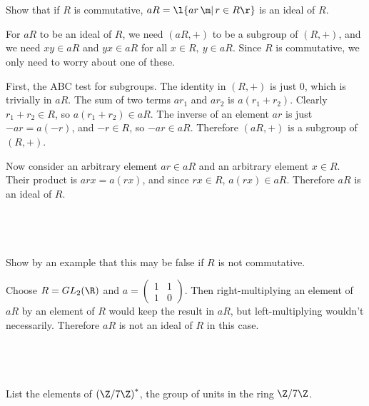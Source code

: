 \documentclass[a4paper]{article}
\begin{document}
\subsection{~} %

\begin{questionbody}
Show that if $R$ is commutative, $aR = \l\{ar \,\m|\, r \in R\r\}$ is an ideal of $R$.
\end{questionbody}

For $aR$ to be an ideal of $R$, we need $(aR, +)$ to be a subgroup of $(R, +)$, and we need $xy \in aR$ and $yx \in aR$ for all $x \in R,\ y \in aR$. Since $R$ is commutative, we only need to worry about one of these.

First, the ABC test for subgroups. The identity in $(R, +)$ is just $0$, which is trivially in $aR$. The sum of two terms $ar_1$ and $ar_2$ is $a(r_1 + r_2)$. Clearly $r_1 + r_2 \in R$, so $a(r_1 + r_2) \in aR$. The inverse of an element $ar$ is just $-ar = a(-r)$, and $-r \in R$, so $-ar \in aR$. Therefore $(aR, +)$ is a subgroup of $(R, +)$.

Now consider an arbitrary element $ar \in aR$ and an arbitrary element $x \in R$. Their product is $arx = a(rx)$, and since $rx \in R$, $a(rx) \in aR$. Therefore $aR$ is an ideal of $R$.

\subsection{~} %

\begin{questionbody}
Show by an example that this may be false if $R$ is not commutative.
\end{questionbody}

Choose $R = GL_2(\R)$ and $a = \begin{pmatrix}1 & 1 \\ 1 & 0\end{pmatrix}$. Then right-multiplying an element of $aR$ by an element of $R$ would keep the result in $aR$, but left-multiplying wouldn't necessarily. Therefore $aR$ is not an ideal of $R$ in this case.


\subsection{~} %

\begin{questionbody}
List the elements of ${(\Z / 7\Z)}^*$, the group of units in the ring $\Z / 7\Z$.
\end{questionbody}
\end{document}
